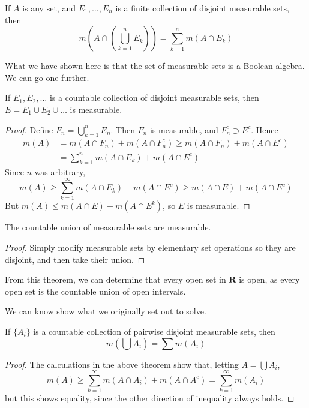 \begin{corollary}
    If $A$ is any set, and $E_1, \dots, E_n$ is a finite collection of disjoint measurable sets, then
    \[ m(A \cap (\bigcup_{k = 1}^n E_k)) = \sum_{k = 1}^n m(A \cap E_k) \]
\end{corollary}

What we have shown here is that the set of measurable sets is a Boolean algebra. We can go one further.

\begin{lemma}
    If $E_1, E_2, \dots$ is a countable collection of disjoint measurable sets, then $E = E_1 \cup E_2 \cup \dots$ is measurable.
\end{lemma}
\begin{proof}
    Define $F_n = \bigcup_{k = 1}^n E_n$. Then $F_n$ is measurable, and $F_n^c \supset E^c$. Hence
    \begin{align*}
        m(A) &= m(A \cap F_n) + m(A \cap F_n^c) \geq m(A \cap F_n) + m(A \cap E^c)\\
        &= \sum_{k = 1}^n m(A \cap E_k) + m(A \cap E^c)
    \end{align*}
    Since $n$ was arbitrary,
    \[ m(A) \geq \sum_{k = 1}^\infty m(A \cap E_k) + m(A \cap E^c) \geq m(A \cap E) + m(A \cap E^c) \]
    But $m(A) \leq m(A \cap E) + m(A \cap E^k)$, so $E$ is measurable.
\end{proof}

\begin{corollary}
    The countable union of measurable sets are measurable.
\end{corollary}
\begin{proof}
    Simply modify measurable sets by elementary set operations so they are disjoint, and then take their union.
\end{proof}

From this theorem, we can determine that every open set in $\mathbf{R}$ is open, as every open set is the countable union of open intervals.

We can know show what we originally set out to solve.

\begin{theorem}
    If $\{ A_i \}$ is a countable collection of pairwise disjoint measurable sets, then
    \[ m(\bigcup A_i) = \sum m(A_i) \]
\end{theorem}
\begin{proof}
    The calculations in the above theorem show that, letting $A = \bigcup A_i$,
    \[ m(A) \geq \sum_{k = 1}^\infty m(A \cap A_i) + m(A \cap A^c) = \sum_{k = 1}^\infty m(A_i) \]
    but this shows equality, since the other direction of inequality always holds.
\end{proof}

